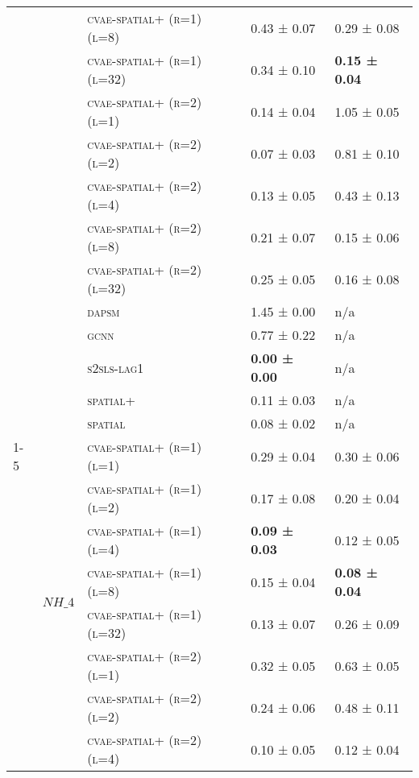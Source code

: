 \documentclass{article}
\begin{document}
\begin{table}[!tbp]
\begin{tabular}{lllll}
 &  & \textsc{cvae-\textsc{spatial+} (r=1) (l=8)} & 0.43 ± {\small 0.07} & 0.29 ± {\small 0.08} \\
 &  & \textsc{cvae-\textsc{spatial+} (r=1) (l=32)} & 0.34 ± {\small 0.10} & \bf 0.15 ± {\small 0.04} \\
 &  & \textsc{cvae-\textsc{spatial+} (r=2) (l=1)} & 0.14 ± {\small 0.04} & 1.05 ± {\small 0.05} \\
 &  & \textsc{cvae-\textsc{spatial+} (r=2) (l=2)} & 0.07 ± {\small 0.03} & 0.81 ± {\small 0.10} \\
 &  & \textsc{cvae-\textsc{spatial+} (r=2) (l=4)} & 0.13 ± {\small 0.05} & 0.43 ± {\small 0.13} \\
 &  & \textsc{cvae-\textsc{spatial+} (r=2) (l=8)} & 0.21 ± {\small 0.07} & 0.15 ± {\small 0.06} \\
 &  & \textsc{cvae-\textsc{spatial+} (r=2) (l=32)} & 0.25 ± {\small 0.05} & 0.16 ± {\small 0.08} \\
 &  & \textsc{dapsm} & 1.45 ± {\small 0.00} & n/a \\
 &  & \textsc{gcnn} & 0.77 ± {\small 0.22} & n/a \\
 &  & \textsc{s2sls-lag1} & \bf 0.00 ± {\small 0.00} & n/a \\
 &  & \textsc{spatial+} & 0.11 ± {\small 0.03} & n/a \\
 &  & \textsc{spatial} & 0.08 ± {\small 0.02} & n/a \\
\cline{1-5} \cline{2-5}
\multirow[t]{30}{*}{$ (LC)\; SO\_{4} \;\to\; PM\_{2.5}\; (r=2) $} & \multirow[t]{15}{*}{$ NH\_{4} $} & \textsc{cvae-\textsc{spatial+} (r=1) (l=1)} & 0.29 ± {\small 0.04} & 0.30 ± {\small 0.06} \\
 &  & \textsc{cvae-\textsc{spatial+} (r=1) (l=2)} & 0.17 ± {\small 0.08} & 0.20 ± {\small 0.04} \\
 &  & \textsc{cvae-\textsc{spatial+} (r=1) (l=4)} & \bf 0.09 ± {\small 0.03} & 0.12 ± {\small 0.05} \\
 &  & \textsc{cvae-\textsc{spatial+} (r=1) (l=8)} & 0.15 ± {\small 0.04} & \bf 0.08 ± {\small 0.04} \\
 &  & \textsc{cvae-\textsc{spatial+} (r=1) (l=32)} & 0.13 ± {\small 0.07} & 0.26 ± {\small 0.09} \\
 &  & \textsc{cvae-\textsc{spatial+} (r=2) (l=1)} & 0.32 ± {\small 0.05} & 0.63 ± {\small 0.05} \\
 &  & \textsc{cvae-\textsc{spatial+} (r=2) (l=2)} & 0.24 ± {\small 0.06} & 0.48 ± {\small 0.11} \\
 &  & \textsc{cvae-\textsc{spatial+} (r=2) (l=4)} & 0.10 ± {\small 0.05} & 0.12 ± {\small 0.04} \\

\end{tabular}
\end{table}
\end{document}
